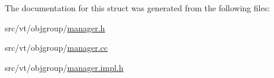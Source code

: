 The documentation for this struct was generated from the following files\+:\begin{DoxyCompactItemize}
\item 
src/vt/objgroup/\hyperlink{objgroup_2manager_8h}{manager.\+h}\item 
src/vt/objgroup/\hyperlink{objgroup_2manager_8cc}{manager.\+cc}\item 
src/vt/objgroup/\hyperlink{objgroup_2manager_8impl_8h}{manager.\+impl.\+h}\end{DoxyCompactItemize}
